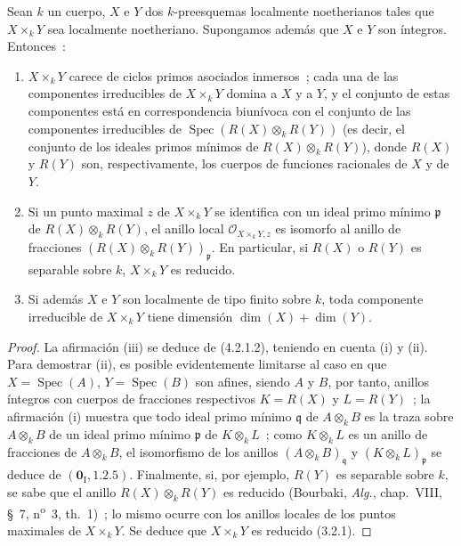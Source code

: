 \begin{proposition}[4.2.4]
\label{IV.2.4.2.4-fr}
Sean $k$ un cuerpo, $X$ e $Y$ dos $k$-preesquemas localmente noetherianos
tales que $X\times_k Y$ sea localmente noetheriano. Supongamos además que $X$ e
$Y$ son íntegros. Entonces~:
\begin{enumerate}
\item[\textup{(i)}] $X\times_k Y$ carece de ciclos primos asociados inmersos~; cada una de las
componentes irreducibles de $X\times_k Y$ domina a $X$ y a $Y$, y el conjunto de
estas componentes está en correspondencia biunívoca con el conjunto de las
componentes irreducibles de
$\operatorname{Spec}(R(X)\otimes_k R(Y))$ \textup{(es decir,} el conjunto de los
ideales primos mínimos de $R(X)\otimes_k R(Y)$\textup{)}, donde $R(X)$ y $R(Y)$ son,
respectivamente, los cuerpos de funciones racionales de $X$ y de $Y$.
\item[\textup{(ii)}] Si un punto maximal $z$ de $X\times_k Y$ se identifica con un ideal
primo mínimo $\mathfrak p$ de $R(X)\otimes_k R(Y)$, el anillo local
$\mathcal O_{X\times_k Y,z}$ es isomorfo al anillo de fracciones
$(R(X)\otimes_k R(Y))_{\mathfrak p}$. En particular, si $R(X)$ o $R(Y)$ es
separable sobre $k$, $X\times_k Y$ es reducido.


\item[\textup{(iii)}] Si además $X$ e $Y$ son localmente de tipo finito sobre $k$,
toda componente irreducible de $X\times_k Y$ tiene dimensión
$\dim(X)+\dim(Y)$.
\end{enumerate}
\end{proposition}

\begin{proof}
La afirmación (iii) se deduce de (4.2.1.2), teniendo en cuenta (i) y (ii). Para
demostrar (ii), es posible evidentemente limitarse al caso en que
$X=\operatorname{Spec}(A)$, $Y=\operatorname{Spec}(B)$ son afines, siendo $A$ y
$B$, por tanto, anillos íntegros con cuerpos de fracciones respectivos
$K=R(X)$ y $L=R(Y)$~; la afirmación (i) muestra que todo ideal primo mínimo
$\mathfrak q$ de $A\otimes_k B$ es la traza sobre $A\otimes_k B$ de un ideal
primo mínimo $\mathfrak p$ de $K\otimes_k L$~; como $K\otimes_k L$ es un
anillo de fracciones de $A\otimes_k B$, el isomorfismo de los anillos
$(A\otimes_k B)_{\mathfrak q}$ y $(K\otimes_k L)_{\mathfrak p}$ se deduce de
$(\mathbf{0}_{\mathrm I},1.2.5)$. Finalmente, si, por ejemplo, $R(Y)$ es separable sobre $k$,
se sabe que el anillo $R(X)\otimes_k R(Y)$ es reducido (Bourbaki,
\emph{Alg.}, chap.~VIII, \S~7, n\textsuperscript{o}~3, th.~1)~; lo mismo ocurre
con los anillos locales de los puntos maximales de $X\times_k Y$. Se deduce
que $X\times_k Y$ es reducido (3.2.1).
\end{proof}

